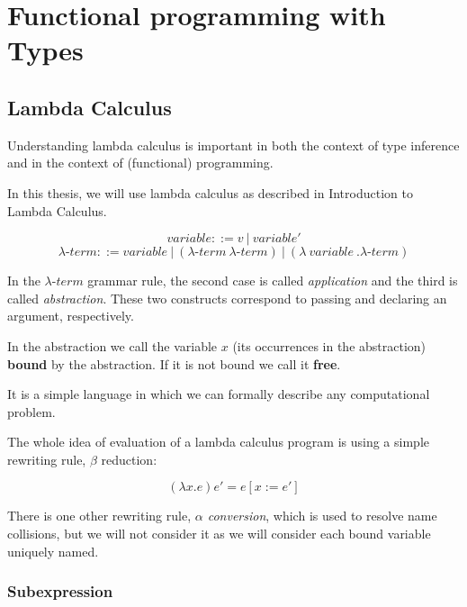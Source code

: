 \chapter{Functional programming with Types}

\section{Lambda Calculus}

Understanding lambda calculus is important in both the context of type inference and in the context of (functional) programming.

In this thesis, we will use lambda calculus as described in Introduction to Lambda Calculus.

\begin{defn}
$$variable ::= v\ |\ variable'$$
$$\lambda\mbox{-}term ::= variable\ |\ (\lambda\mbox{-}term\ \lambda\mbox{-}term)\ |\ (\lambda\ variable\ . \lambda\mbox{-}term )$$
\end{defn}

In the $\lambda\mbox{-}term$ grammar rule, the second case is called \emph{application} and the third is called \emph{abstraction}. These two constructs correspond to passing and declaring an argument, respectively.

\begin{defn}
    \label{defn:boundFree}
    In the abstraction we call the variable $x$ (its occurrences in the abstraction) \textbf{bound} by the abstraction. If it is not bound we call it \textbf{free}.
\end{defn}

It is a simple language in which we can formally describe any computational problem.

The whole idea of evaluation of a lambda calculus program is using a simple rewriting rule, $\beta$ reduction:

\begin{defn}
    $$(\lambda x . e) e' = e [x := e']$$ \cite{barendregt1992lambda}
\end{defn}

There is one other rewriting rule, \emph{$\alpha$ conversion}, which is used to resolve name collisions, but we will not consider it as we will consider each bound variable uniquely named.

\subsection{Subexpression}

